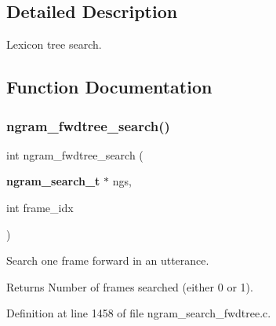 \subsection{Detailed Description}
Lexicon tree search. 



\subsection{Function Documentation}
\mbox{\label{ngram__search__fwdtree_8c_a9e2828ba0d249424a234b6cf7d3ee530}} 
\subsubsection{ngram\+\_\+fwdtree\+\_\+search()}
{\footnotesize\ttfamily int ngram\+\_\+fwdtree\+\_\+search (\begin{DoxyParamCaption}\item[{\textbf{ ngram\+\_\+search\+\_\+t} $\ast$}]{ngs,  }\item[{int}]{frame\+\_\+idx }\end{DoxyParamCaption})}



Search one frame forward in an utterance. 

\begin{DoxyReturn}{Returns}
Number of frames searched (either 0 or 1). 
\end{DoxyReturn}


Definition at line 1458 of file ngram\+\_\+search\+\_\+fwdtree.\+c.

